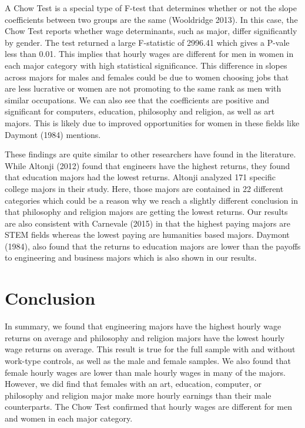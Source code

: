 \documentclass[12pt]{article}
\begin{document}
\par A Chow Test is a special type of F-test that determines whether or not the slope coefficients between two groups are the same (Wooldridge 2013). In this case, the Chow Test reports whether wage determinants, such as major, differ significantly by gender. The test returned a large F-statistic of 2996.41 which gives a P-vale less than 0.01. This implies that hourly wages are different for men in women in each major category with high statistical significance. This difference in slopes across majors for males and females could be due to women choosing jobs that are less lucrative or women are not promoting to the same rank as men with similar occupations. We can also see that the coefficients are positive and significant for computers, education, philosophy and religion, as well as art majors. This is likely due to improved opportunities for women in these fields like Daymont (1984) mentions. 

\par These findings are quite similar to other researchers have found in the literature. While Altonji (2012) found that engineers have the highest returns, they found that education majors had the lowest returns. Altonji analyzed 171 specific college majors in their study. Here, those majors are contained in 22 different categories which could be a reason why we reach a slightly different conclusion in that philosophy and religion majors are getting the lowest returns. Our results are also consistent with Carnevale (2015) in that the highest paying majors are STEM fields whereas the lowest paying are humanities based majors. Daymont (1984), also found that the returns to education majors are lower than the payoffs to engineering and business majors which is also shown in our results.
 
\section{Conclusion}
\par In summary, we found that engineering majors have the highest hourly wage returns on average and philosophy and religion majors have the lowest hourly wage returns on average. This result is true for the full sample with and without work-type controls, as well as the male and female samples. We also found that female hourly wages are lower than male hourly wages in many of the majors. However, we did find that females with an art, education, computer, or philosophy and religion major make more hourly earnings than their male counterparts. The Chow Test confirmed that hourly wages are different for men and women in each major category.  
\end{document}
